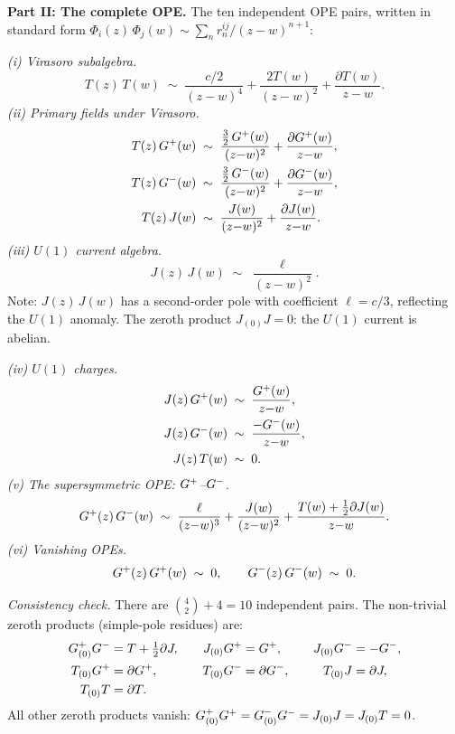 \begin{computation}
\medskip
\noindent\textbf{Part II: The complete OPE.}
The ten independent OPE pairs, written in standard form
$\Phi_i(z)\,\Phi_j(w) \sim \sum_n r_n^{ij}/(z{-}w)^{n+1}$:

\smallskip
\noindent\emph{(i) Virasoro subalgebra.}
\begin{equation}\label{eq:n2-TT}
T(z)\,T(w)\;\sim\;\frac{c/2}{(z{-}w)^4}
+\frac{2T(w)}{(z{-}w)^2}+\frac{\partial T(w)}{z{-}w}.
\end{equation}
\emph{(ii) Primary fields under Virasoro.}
\begin{align}
T(z)\,G^+(w)&\;\sim\;\frac{\tfrac32\,G^+(w)}{(z{-}w)^2}
+\frac{\partial G^+(w)}{z{-}w},\label{eq:n2-TGp}\\
T(z)\,G^-(w)&\;\sim\;\frac{\tfrac32\,G^-(w)}{(z{-}w)^2}
+\frac{\partial G^-(w)}{z{-}w},\label{eq:n2-TGm}\\
T(z)\,J(w)&\;\sim\;\frac{J(w)}{(z{-}w)^2}
+\frac{\partial J(w)}{z{-}w}.\label{eq:n2-TJ}
\end{align}
\emph{(iii) $U(1)$ current algebra.}
\begin{equation}\label{eq:n2-JJ}
J(z)\,J(w)\;\sim\;\frac{\ell}{(z{-}w)^2}.
\end{equation}
Note: $J(z)\,J(w)$ has a second-order pole with coefficient
$\ell = c/3$, reflecting the $U(1)$ anomaly. The zeroth
product $J_{(0)}J = 0$: the $U(1)$ current is abelian.

\smallskip
\noindent\emph{(iv) $U(1)$ charges.}
\begin{align}
J(z)\,G^+(w)&\;\sim\;\frac{G^+(w)}{z{-}w},\label{eq:n2-JGp}\\
J(z)\,G^-(w)&\;\sim\;\frac{-G^-(w)}{z{-}w},\label{eq:n2-JGm}\\
J(z)\,T(w)&\;\sim\;0.\label{eq:n2-JT}
\end{align}
\emph{(v) The supersymmetric OPE: $G^+$--$G^-$.}
\begin{equation}\label{eq:n2-GpGm}
G^+(z)\,G^-(w)\;\sim\;\frac{\ell}{(z{-}w)^3}
+\frac{J(w)}{(z{-}w)^2}
+\frac{T(w)+\frac12\partial J(w)}{z{-}w}.
\end{equation}
\emph{(vi) Vanishing OPEs.}
\begin{equation}\label{eq:n2-vanishing}
G^+(z)\,G^+(w)\;\sim\;0,\qquad
G^-(z)\,G^-(w)\;\sim\;0.
\end{equation}

\smallskip
\noindent\emph{Consistency check.}
There are $\binom{4}{2}+4=10$ independent pairs. The non-trivial
zeroth products (simple-pole residues) are:
\begin{equation}\label{eq:n2-zeroth-products}
\begin{aligned}
G^+_{(0)}G^- &= T + \tfrac12\partial J, &\quad
J_{(0)}G^+ &= G^+, &\quad
J_{(0)}G^- &= -G^-, \\
T_{(0)}G^+ &= \partial G^+, &\quad
T_{(0)}G^- &= \partial G^-, &\quad
T_{(0)}J &= \partial J, \\
T_{(0)}T &= \partial T.
\end{aligned}
\end{equation}
All other zeroth products vanish:
$G^+_{(0)}G^+ = G^-_{(0)}G^- = J_{(0)}J = J_{(0)}T = 0$.


\end{computation}
